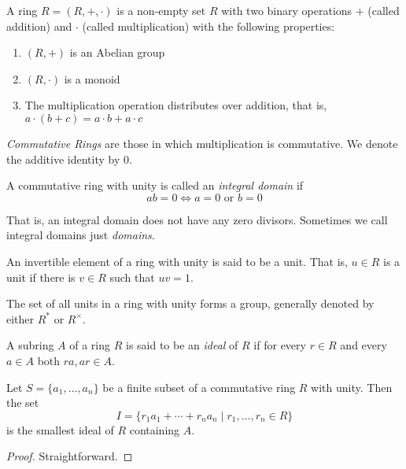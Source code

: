 \begin{definition}
    A ring $R = (R, +,\cdot)$ is a non-empty set $R$ with two binary operations $+$ (called addition) and $\cdot$ (called multiplication) with the following properties: 
    \begin{enumerate}
        \item $(R, +)$ is an Abelian group 
        \item $(R, \cdot)$ is a monoid 
        \item The multiplication operation distributes over addition, that is, $a\cdot(b + c) = a\cdot b + a\cdot c$
    \end{enumerate}
\end{definition}

\textit{Commutative Rings} are those in which multiplication is commutative. We denote the additive identity by $0$.

\begin{definition}
    A commutative ring with unity is called an \textit{integral domain} if 
    \begin{equation*}
        ab = 0 \Longleftrightarrow a = 0 \text{ or } b = 0
    \end{equation*}
\end{definition}

That is, an integral domain does not have any zero divisors. Sometimes we call integral domains just \textit{domains}.

\begin{definition}[Unit]
    An invertible element of a ring with unity is said to be a unit. That is, $u\in R$ is a unit if there is $v\in R$ such that $uv = 1$.

    The set of all units in a ring with unity forms a group, generally denoted by either $R^*$ or $R^\times$.
\end{definition}

\begin{definition}[Ideal]
    A subring $A$ of a ring $R$ is said to be an \textit{ideal} of $R$ if for every $r\in R$ and every $a\in A$ both $ra, ar\in A$.
\end{definition}

\begin{lemma}
    Let $S = \{a_1,\ldots,a_n\}$ be a finite subset of a commutative ring $R$ with unity. Then the set 
    \begin{equation*}
        I = \{r_1a_1 + \cdots + r_na_n\mid r_1,\ldots,r_n\in R\}
    \end{equation*}
    is the smallest ideal of $R$ containing $A$.
\end{lemma}
\begin{proof}
    Straightforward.
\end{proof}

